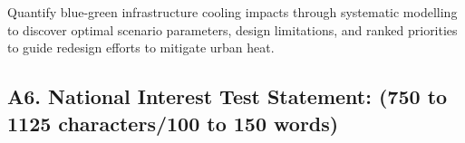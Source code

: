 
Quantify blue-green infrastructure cooling impacts through systematic modelling to discover optimal scenario parameters, design limitations, and ranked priorities to guide redesign efforts to mitigate urban heat.


\subsection*{\TitleFont A6. National Interest Test Statement: (750 to 1125 characters/100 to 150 words) }




 
 
